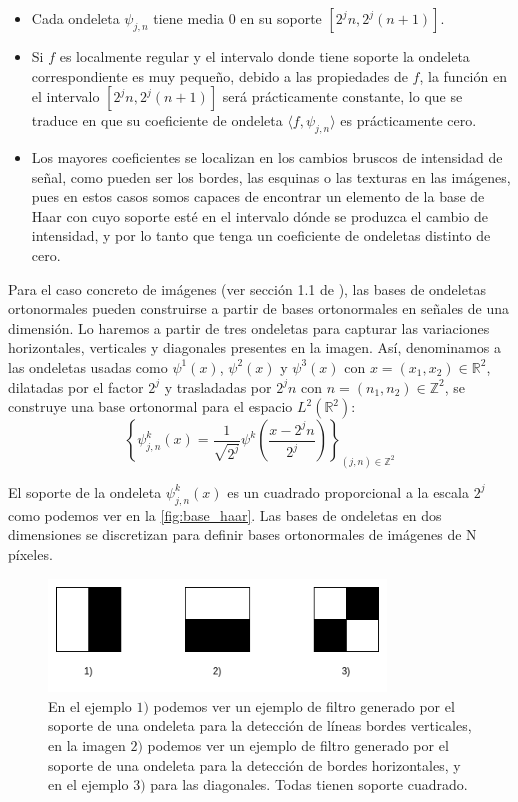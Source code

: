 \newpage

\begin{itemize}
  \item Cada ondeleta $\psi_{j,n}$ tiene media $0$ en su soporte $[2^jn, 2^j(n+1)]$.
  \item Si $f$ es localmente regular y el intervalo donde tiene soporte la ondeleta correspondiente es muy pequeño, debido a las propiedades de $f$, la función en el intervalo  $[2^jn, 2^j(n+1)]$ será prácticamente constante, lo que se traduce en que su coeficiente de ondeleta $\langle f,\psi_{j,n} \rangle$ es prácticamente cero.
  \item Los mayores coeficientes se localizan en los cambios bruscos de intensidad de señal, como pueden ser los bordes, las esquinas o las texturas en las imágenes, pues en estos casos somos capaces de encontrar un elemento de la base de Haar con cuyo soporte esté en el intervalo dónde se produzca el cambio de intensidad, y por lo tanto que tenga un coeficiente de ondeletas distinto de cero.
\end{itemize}

\noindent Para el caso concreto de imágenes (ver sección 1.1 de \cite{MallatWavelets}), las bases de ondeletas ortonormales pueden construirse a partir de bases ortonormales en señales de una dimensión. Lo haremos a partir de tres ondeletas para capturar las variaciones horizontales, verticales y diagonales presentes en la imagen. Así, denominamos a las ondeletas usadas como $\psi^1(x)$, $\psi^2(x)$ y $\psi^3(x)$ con $x=(x_1,x_2)\in \mathbb{R}^2$, dilatadas por el factor $2^j$ y trasladadas por $2^jn$ con $n=(n_1,n_2) \in \mathbb{Z}^2$, se construye una base ortonormal para el espacio $L^2(\mathbb{R}^2)$: 
$$\left \lbrace \psi_{j,n}^k(x)= \frac{1}{\sqrt{2^j}} \psi^k\left(\frac{x-2^jn}{2^j}\right) \right \rbrace_{(j,n) \in \mathbb{Z}^2}$$

\medskip

\noindent El soporte de la ondeleta $\psi_{j,n}^k(x)$ es un cuadrado proporcional a la escala $2^j$ como podemos ver en la \autoref{fig:base_haar}. Las bases de ondeletas en dos dimensiones se discretizan para definir bases ortonormales de imágenes de N píxeles.


\begin{figure} [!h]
  \centering
  \includegraphics[width=0.8\textwidth]{img/base_haar_2d.png}
  \caption{En el ejemplo $1)$ podemos ver un ejemplo de filtro generado por el soporte de una ondeleta para la detección de líneas bordes verticales, en la imagen $2)$ podemos ver un ejemplo de filtro generado por el soporte de una ondeleta para la detección de bordes horizontales, y en el ejemplo $3)$ para las diagonales. Todas tienen soporte cuadrado.}
  \label{fig:base_haar}
\end{figure}

